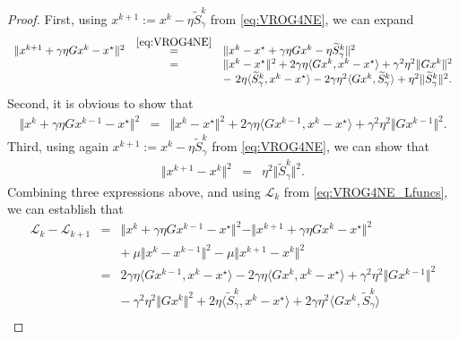 \documentclass{article}
\newcommand{\norms}[1]{\Vert#1\Vert}
\newcommand{\iprods}[1]{\langle #1\rangle}
\newcommand{\Lc}{\mathcal{L}}
\theoremstyle{plain}
\theoremstyle{definition}
\theoremstyle{remark}
\begin{document}
\begin{proof}
First, using $x^{k+1} := x^k - \eta \widetilde{S}_{\gamma}^k$ from \eqref{eq:VROG4NE}, we can expand
\begin{equation*} 
\begin{array}{lcl}
\norms{x^{k+1} + \gamma\eta Gx^{k} - x^{\star}}^2  & \overset{\tiny\eqref{eq:VROG4NE}}{=} & \norms{x^k - x^{\star} + \gamma\eta Gx^k - \eta \widetilde{S}_{\gamma}^k }^2 \\
& = & \norms{x^k - x^{\star}}^2 + 2\gamma\eta\iprods{Gx^k, x^k - x^{\star}} +  \gamma^2\eta^2\norms{Gx^k}^2  \\
&& - {~}  2\eta \iprods{\widetilde{S}_{\gamma}^k, x^k - x^{\star}} - 2\gamma\eta^2 \iprods{Gx^k, \widetilde{S}_{\gamma}^k} + \eta^2\norms{\widetilde{S}_{\gamma}^k}^2.
\end{array}
\end{equation*}
Second, it is obvious to show that
\begin{equation*} 
\begin{array}{lcl}
\norms{x^k + \gamma\eta Gx^{k-1} - x^{\star}}^2 & = & \norms{x^k - x^{\star}}^2 + 2\gamma\eta\iprods{Gx^{k-1}, x^k - x^{\star}} + \gamma^2\eta^2\norms{Gx^{k-1}}^2.
\end{array}
\end{equation*}
Third, using again $x^{k+1} := x^k - \eta \widetilde{S}_{\gamma}^k$ from \eqref{eq:VROG4NE}, we can show that
\begin{equation*} 
\begin{array}{lcl}
\norms{x^{k+1} - x^k}^2 &= & \eta^2\norms{\widetilde{S}_{\gamma}^k}^2.
\end{array}
\end{equation*}
Combining three expressions above, and using $\Lc_k$ from \eqref{eq:VROG4NE_Lfuncs}, we can establish  that 
\begin{equation}\label{eq:VROG4NE_proof1} 
\begin{array}{lcl}
\Lc_k - \Lc_{k+1}  & = & \norms{x^k + \gamma\eta Gx^{k-1} - x^{\star}}^2 - \norms{x^{k+1} + \gamma\eta Gx^{k} - x^{\star}}^2 \\
&& + {~} \mu\norms{x^k - x^{k-1}}^2 - \mu \norms{x^{k+1} - x^k}^2\\
& = & 2\gamma\eta\iprods{Gx^{k-1}, x^k - x^{\star}} - 2\gamma\eta \iprods{ Gx^k, x^k - x^{\star}}   +  \gamma^2\eta^2\norms{Gx^{k-1}}^2 \\
&& - {~} \gamma^2\eta^2\norms{Gx^k}^2 +   2\eta \iprods{\widetilde{S}^k_{\gamma}, x^k - x^{\star}} + 2\gamma\eta^2 \iprods{Gx^k, \widetilde{S}_{\gamma}^k} \\

\end{array}
\end{equation}
\end{proof}
\end{document}

